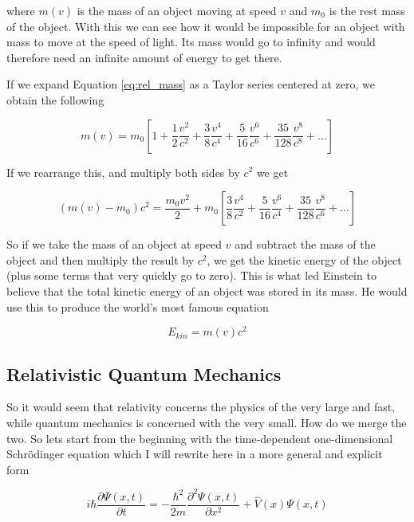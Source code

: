\documentclass[12pt]{report}
\begin{document}
where $m(v)$ is the mass of an object moving at speed $v$ and $m_{0}$ is the rest mass of the object. With this we can see how it would be impossible for an object with mass to move at the speed of light. Its mass would go to infinity and would therefore need an infinite amount of energy to get there.

If we expand Equation \ref{eq:rel_mass} as a Taylor series centered at zero, we obtain the following 

\begin{equation}
\label{eq:rel_mass_taylor}
m(v) = m_{0}\left[1 + \frac{1}{2}\frac{v^{2}}{c^{2}} + \frac{3}{8}\frac{v^{4}}{c^{4}} + \frac{5}{16}\frac{v^{6}}{c^{6}} + \frac{35}{128}\frac{v^{8}}{c^{8}} + \ldots\right]
\end{equation}

If we rearrange this, and multiply both sides by $c^{2}$ we get

\begin{equation}
\label{eq:rel_mass_taylor_rea}
(m(v) -  m_{0})c^{2}= \frac{m_{0}v^{2}}{2} + m_{0}\left[\frac{3}{8}\frac{v^{4}}{c^{2}} + \frac{5}{16}\frac{v^{6}}{c^{4}} + \frac{35}{128}\frac{v^{8}}{c^{6}} + \ldots\right]
\end{equation}

So if we take the mass of an object at speed $v$ and subtract the mass of the object and then multiply the result by $c^{2}$, we get the kinetic energy of the object (plus some terms that very quickly go to zero). This is what led Einstein to believe that the total kinetic energy of an object was stored in its mass. He would use this to produce the world's most famous equation

\begin{equation}
\label{eq:emc2}
E_{kin} = m(v)c^{2}
\end{equation}

\subsection{Relativistic Quantum Mechanics}
So it would seem that relativity concerns the physics of the very large and fast, while quantum mechanics is concerned with the very small. How do we merge the two. So lets start from the beginning with the time-dependent one-dimensional Schr\"{o}dinger equation which I will rewrite here in a more general and explicit form\cite{1926PhRv...28.1049S}

\begin{equation}
\label{eq:schr_full}
i\hbar\frac{\partial\Psi(x, t)}{\partial t} = -\frac{\hbar^{2}}{2m}\frac{\partial^{2}\Psi(x, t)}{\partial x^{2}} + \hat{V}(x)\Psi(x, t)
\end{equation}
\end{document}
